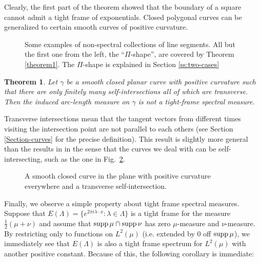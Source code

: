 \documentclass[12pt,a4paper,oneside]{amsart}
\newtheorem{theorem}{Theorem}
\theoremstyle{definition}
\newcommand{\supp}{{\rm supp\,}}
\newcounter{rem}
\begin{document}
Clearly, the first part of the theorem showed that the boundary of a square cannot admit a tight frame of exponentials. Closed polygonal curves can be generalized to certain smooth curve{s} of positive curvature.

\begin{figure}[h]
\ifdefined\SMART\resizebox{4cm}{!}{}\else
\resizebox{15cm}{!}{}
\fi
\caption{Some examples of non-spectral collections of line segments. All but the first one from the left, the ``$\Pi$-shape'', are covered by Theorem \ref{theorem1}. The $\Pi$-shape is explained in Section \ref{ss:two-cases}}\label{fig:polygons}
\end{figure}


\begin{theorem}\label{theorem2}
Let $\gamma$ be a smooth closed planar curve with positive curvature such that there are only finitely many self-intersections {all of which are transverse}. Then the induced arc-length measure on $\gamma$ is not a {tight-frame} spectral measure. 
\end{theorem}

Transverse intersections mean that the tangent vectors from different time{s visiting} the intersection {point} are not parallel to each others ({s}ee Section \ref{Section-curves} for the precise definition).  This result is slightly more general than the results in \cite{iosevich2022fourier} in the sense that {the curves we deal with} can be self-intersecting, such as the one in Fig.\ \ref{fig:closed-curve}.

\begin{figure}[h]
\ifdefined\SMART\resizebox{4cm}{!}{}\else
\resizebox{4cm}{!}{}
\fi
\caption{A smooth closed curve in the plane with positive curvature everywhere and a transverse self-intersection.}\label{fig:closed-curve}
\end{figure}

Finally, we observe a simple property about tight frame spectral measures. Suppose that $E(\Lambda) = \{e^{2\pi i \lambda\cdot x}: \lambda\in\Lambda\}$ is a tight frame for the measure $\frac12(\mu+\nu)$ {and assume that $\supp\mu \cap \supp\nu$ has zero $\mu$-measure and $\nu$-measure}. By restricting only to functions on $L^2(\mu)$ {(i.e. extended by 0 off $\supp\mu$)}, we immediately see that $E(\Lambda)$ is also a tight frame spectrum for $L^2(\mu)$ with another positive constant.  Because of this, the following corollary is immediate:
\end{document}
